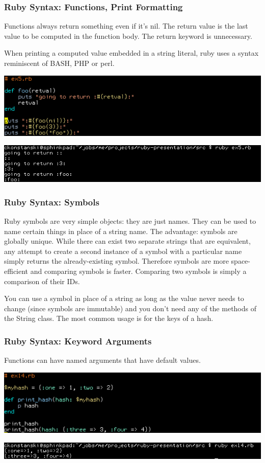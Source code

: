 \documentclass[helvetica,english,utf8,notitle,nologo]{beamer}
\begin{document}
\begin{frame}
  \frametitle{Ruby Syntax: Functions, Print Formatting}

  Functions always return something even if it's nil. The return value
  is the last value to be computed in the function body. The return
  keyword is unnecessary.

  When printing a computed value embedded in a string literal, ruby
  uses a syntax reminiscent of BASH, PHP or perl.

  \includegraphics[scale=0.53]{src_5}

  \includegraphics[scale=0.5]{out_5}
\end{frame}

\begin{frame}
  \frametitle{Ruby Syntax: Symbols}

  Ruby symbols are very simple objects: they are just names. They can
  be used to name certain things in place of a string name. The
  advantage: symbols are globally unique. While there can exist two
  separate strings that are equivalent, any attempt to create a second
  instance of a symbol with a particular name simply returns the
  already-existing symbol. Therefore symbols are more space-efficient
  and comparing symbols is faster. Comparing two symbols is simply a
  comparison of their IDs.

  You can use a symbol in place of a string as long as the value never
  needs to change (since symbols are immutable) and you don't need any
  of the methods of the String class. The most common usage is for the
  keys of a hash.
\end{frame}

\begin{frame}
  \frametitle{Ruby Syntax: Keyword Arguments}

  Functions can have named arguments that have default values.

  \includegraphics[scale=0.53]{src_14}

  \includegraphics[scale=0.5]{out_14}
\end{frame}
\end{document}
